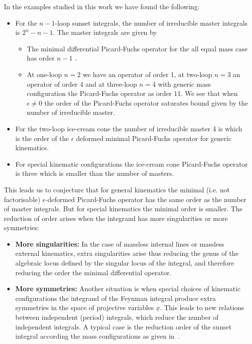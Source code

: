 \documentclass[a4paper,12pt]{article}
\newcommand\lNote[1]{
	\todo[backgroundcolor=red!20!white,fancyline,
	bordercolor=white]{ LDLC:  #1}}
\numberwithin{equation}{section}
\numberwithin{figure}{section}
\begin{document}
In the examples studied in this work we have found the following:

\begin{itemize}
	\item  For the $n-1$-loop
	sunset integrals, the number of irreducible master integrals 
	is $2^{n}-n-1$. \lNote{cite?} The \lNote{number of}  master integrals are given by 
%
%	
	\begin{itemize}  \item The minimal differential Picard-Fuchs operator for the all
		equal mass case has order  $n-1$ .
		\item At one-loop $n=2$ we have an operator of order 1, at two-loop
		$n=3$ an operator of order 4 and at three-loop $n=4$ with generic
		mass configuration the Picard-Fuchs operator
		as   order 11.  We see that when $\epsilon\neq0$  the order of the
		Picard-Fuchs operator saturates bound given by the number of
		irreducible master.
	\end{itemize}
	\item For the two-loop ice-cream cone the number of irreducible
	master 4 is which is the order of the $\epsilon$ deformed minimal Picard-Fuchs
	operator for generic kinematics.
        \item For special kinematic configurations  the ice-cream cone
          Picard-Fuchs operator  is three which is smaller than the
          number of masters.
\end{itemize}
This leads us to conjecture that 
 for general kinematics the minimal (i.e. not
factorisable) $\epsilon$-deformed Picard-Fuchs operator has 
the same order
as the number of master integrals. But for special kinematics the minimal
order is smaller.
%
The reduction of order arises when the integrand has more
singularities or more symmetries:
\begin{itemize}
  \item {\bf More singularities:} In the case of
massless internal lines or massless external kinematics, extra
singularities arise thus reducing the genus of the algebraic locus defined
by the singular locus of the integral, and therefore reducing the
order the minimal differential operator. \lNote{confusing}
\item {\bf More symmetries:}
Another situation is when special choices of kinematic
configurations the integrand of the Feynman integral produce extra
symmetries in the space of projective variables $\underline
x$. This leads to new relations between independent (period) integrals, which reduce the number of independent integrals. A typical case is the
reduction order of the sunset integral according the mass
configurations as given in~\cite{Bloch:2014qca,Lairez:2022zkj,Bonisch:2021yfw,Bonisch:2020qmm,Pogel:2022vat}.
\end{itemize}
\end{document}
